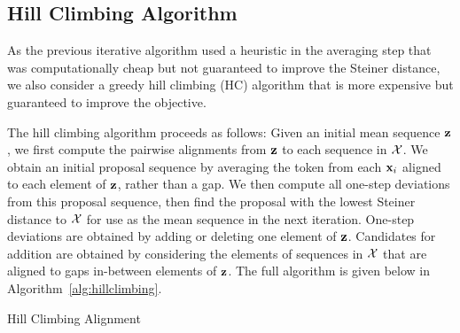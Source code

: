 \documentclass{article}
\begin{document}
\subsection{Hill Climbing Algorithm}
As the previous iterative algorithm used a heuristic in the averaging step
that was computationally cheap but not guaranteed to improve the Steiner distance,
we also consider a greedy hill climbing (HC) algorithm that is more expensive but
guaranteed to improve the objective.

The hill climbing algorithm proceeds as follows: Given an initial mean sequence $\bz$,
we first compute the pairwise alignments from $\bz$ to each sequence in $\mathcal{X}$.
We obtain an initial proposal sequence by averaging the token from each $\mathbf{x}_i$ aligned
to each element of $\bz$, rather than a gap.
We then compute all one-step deviations from this proposal sequence,
then find the proposal with the lowest Steiner distance to $\mathcal{X}$ for use as 
the mean sequence in the next iteration.
One-step deviations are obtained by adding or deleting one element of $\bz$.
Candidates for addition are obtained by considering the elements of sequences in $\mathcal{X}$
that are aligned to gaps in-between elements of $\bz$.
The full algorithm is given below in Algorithm~\ref{alg:hillclimbing}.

\begin{algorithm}[h]
\begin{algorithmic}
    \EndFor
        \EndFor
        \EndFor
    \EndFor
    \Return{$\bz$}
    \EndIf
\EndFor
\Return{$\bz$}
\EndFunction
{}
\EndFor
\Return{$\bz$}
\EndFunction
\end{algorithmic}
\caption{\label{alg:hillclimbing}
Hill Climbing Alignment
}
\end{algorithm}
\end{document}
